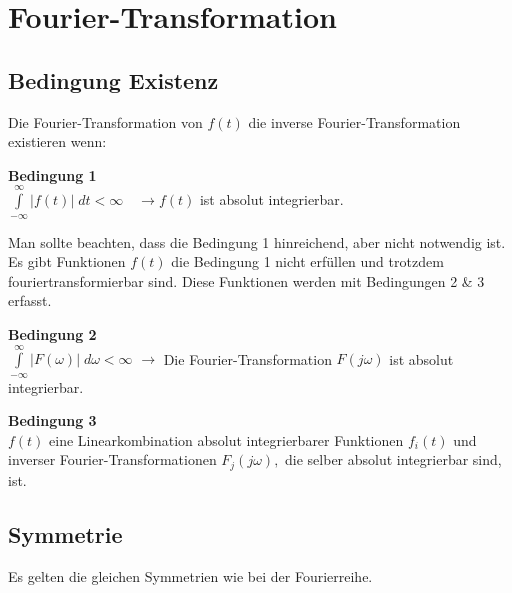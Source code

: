 
\section{Fourier-Transformation}%
	\subsection{Bedingung Existenz}%
		\vspace{-3mm}	%
		Die Fourier-Transformation von $f(t)$
		die inverse Fourier-Transformation existieren  wenn:
		
		\textbf{Bedingung 1}\\
			$\int\limits_{-\infty}^{\infty}|f(t)| \; d t<\infty \quad \rightarrow f(t)$ ist absolut integrierbar.
			
		Man sollte beachten, dass die Bedingung 1 hinreichend, aber nicht notwendig ist. Es gibt Funktionen $f(t)$ die Bedingung 1 nicht erfüllen und trotzdem fouriertransformierbar sind. Diese Funktionen werden mit Bedingungen 2 \& 3 erfasst. 
		
		\textbf{Bedingung 2}\\
			$\int\limits_{-\infty}^{\infty}|F(\omega)| \; d \omega<\infty$ \quad
			$\rightarrow$ Die Fourier-Transformation $F(j \omega)$ ist absolut integrierbar.
			
		\textbf{Bedingung 3}\\
			$f(t)$ eine Linearkombination absolut integrierbarer Funktionen
			$f_{i}(t)$ und inverser Fourier-Transformationen $F_{j}(j \omega),$ die selber
			absolut integrierbar sind, ist.
			
	\subsection{Symmetrie}%
		\vspace{-3mm}	%
		Es gelten die gleichen Symmetrien wie bei der Fourierreihe.

